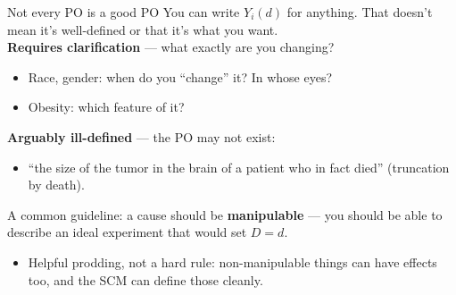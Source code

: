\documentclass[xcolor=dvipsnames]{beamer}
\newcommand\indep{\protect\mathpalette{\protect\independenT}{\perp}}
\def\independenT#1#2{\mathrel{\rlap{$#1#2$}\mkern2mu{#1#2}}}
\begin{document}
\begin{frame}{Not every PO is a good PO}
\small
{} You can write $Y_i(d)$ for anything. That doesn't mean it's well-defined or that it's what you want.\\
\bigskip
{} \textbf{Requires clarification} --- what exactly are you changing?
\footnotesize
\begin{itemize}
\item Race, gender: when do you ``change'' it? In whose eyes?
\item Obesity: which feature of it?
\end{itemize}
\smallskip
\small
{} \textbf{Arguably ill-defined} --- the PO may not exist:
\footnotesize
\begin{itemize}
\item ``the size of the tumor in the brain of a patient who in fact died'' (truncation by death).
\end{itemize}
\smallskip
\small
{} A common guideline: a cause should be \textbf{manipulable} --- you should be able to describe an ideal experiment that would set $D=d$.
\footnotesize
\begin{itemize}
\item Helpful prodding, not a hard rule: non-manipulable things can have effects too, and the SCM can define those cleanly.
\end{itemize}
\end{frame}


\end{document}
